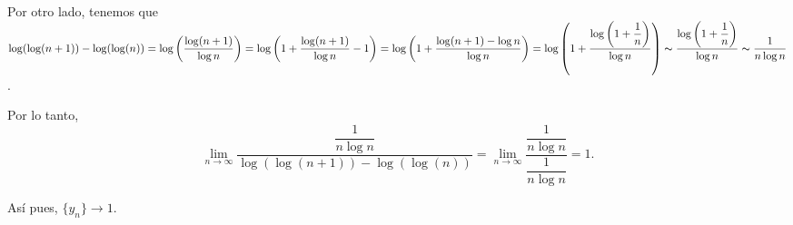 \documentclass[10pt,a4paper]{article}
\begin{document}
	Por otro lado, tenemos que $\log (\log (n+1))-\log(\log(n)) = \log \left( \dfrac{\log(n+1)}{\log n} \right) = \log \left( 1 + \dfrac{\log(n+1)}{\log n} - 1 \right) = \log \left( 1 + \dfrac{\log(n+1) - \log n}{\log n} \right) = \log \left( 1 + \dfrac{\log \left(1 + \dfrac{1}{n}\right)}{\log n} \right) \thicksim \dfrac{\log \left(1 + \dfrac{1}{n}\right)}{\log n} \thicksim \dfrac{1}{n \log n}$. \newline
	
	Por lo tanto, $$\lim_{n \rightarrow \infty} \dfrac{\dfrac{1}{n\log n}}{\log (\log (n+1))-\log(\log(n))} = \lim_{n \rightarrow \infty}\dfrac{\dfrac{1}{n\log n}}{\dfrac{1}{n\log n}} = 1.$$
	
	Así pues, $\{y_n\} \rightarrow 1$.
\end{document}
